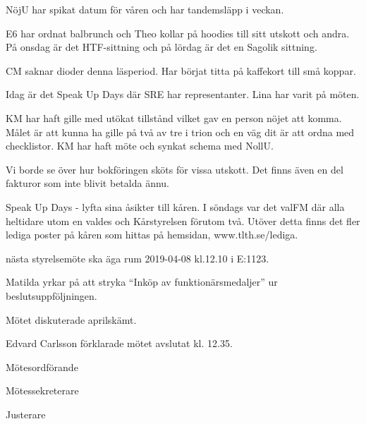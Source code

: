 \documentclass[10pt]{article}
\def\mo{Edvard Carlsson}
\def\ms{Saga Åslund}
\def\ji{Theo Nyman}
\begin{document}
\begin{paragrafer}
\begin{paragrafer}
NöjU har spikat datum för våren och har tandemsläpp i veckan. 

E6 har ordnat balbrunch och Theo kollar på hoodies till sitt utskott och andra. På onsdag är det HTF-sittning och på lördag är det en Sagolik sittning.

CM saknar dioder denna läsperiod. Har börjat titta på kaffekort till små koppar. 

Idag är det Speak Up Days där SRE har representanter. Lina har varit på möten. 

KM har haft gille med utökat tillstånd vilket gav en person nöjet att komma. Målet är att kunna ha gille på två av tre i trion och en väg dit är att ordna med checklistor. KM har haft möte och synkat schema med NollU. 


Vi borde se över hur bokföringen sköts för vissa utskott. Det finns även en del fakturor som inte blivit betalda ännu.  

Speak Up Days - lyfta sina åsikter till kåren. 
I söndags var det valFM där alla heltidare utom en valdes och Kårstyrelsen förutom två. Utöver detta finns det fler lediga poster på kåren som hittas på hemsidan, www.tlth.se/lediga. 
\end{paragrafer}

\Mba nästa styrelsemöte ska äga rum 2019-04-08 kl.12.10 i E:1123.

Matilda yrkar på att stryka ``Inköp av funktionärsmedaljer'' ur beslutsuppföljningen.

\Mbaby


Mötet diskuterade aprilskämt.

{\mo} förklarade mötet avslutat kl. 12.35.
\end{paragrafer}

\hidesignfoot
\begin{signatures}{3}
\signature{\mo}{Mötesordförande}
\signature{\ms}{Mötessekreterare}
\signature{\ji}{Justerare}
\end{signatures}
\end{document}

